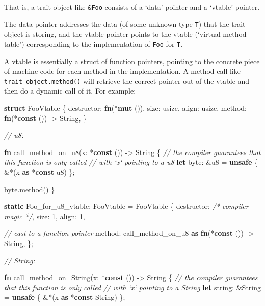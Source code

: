 \documentclass[a4paper,]{book}
\newenvironment{Shaded}{\begin{snugshade}}{\end{snugshade}}
\newcommand{\KeywordTok}[1]{\textcolor[rgb]{0.13,0.29,0.53}{\textbf{{#1}}}}
\newcommand{\DataTypeTok}[1]{\textcolor[rgb]{0.13,0.29,0.53}{{#1}}}
\newcommand{\DecValTok}[1]{\textcolor[rgb]{0.00,0.00,0.81}{{#1}}}
\newcommand{\CommentTok}[1]{\textcolor[rgb]{0.56,0.35,0.01}{\textit{{#1}}}}
\newcommand{\NormalTok}[1]{{#1}}
\begin{document}
That is, a trait object like \texttt{\&Foo} consists of a `data' pointer
and a `vtable' pointer.

The data pointer addresses the data (of some unknown type \texttt{T})
that the trait object is storing, and the vtable pointer points to the
vtable (`virtual method table') corresponding to the implementation of
\texttt{Foo} for \texttt{T}.

A vtable is essentially a struct of function pointers, pointing to the
concrete piece of machine code for each method in the implementation. A
method call like \texttt{trait\_object.method()} will retrieve the
correct pointer out of the vtable and then do a dynamic call of it. For
example:

\begin{Shaded}
\begin{Highlighting}[]
\KeywordTok{struct} \NormalTok{FooVtable \{}
    \NormalTok{destructor: }\KeywordTok{fn}\NormalTok{(*}\KeywordTok{mut} \NormalTok{()),}
    \NormalTok{size: }\DataTypeTok{usize}\NormalTok{,}
    \NormalTok{align: }\DataTypeTok{usize}\NormalTok{,}
    \NormalTok{method: }\KeywordTok{fn}\NormalTok{(*}\KeywordTok{const} \NormalTok{()) -> }\DataTypeTok{String}\NormalTok{,}
\NormalTok{\}}

\CommentTok{// u8:}

\KeywordTok{fn} \NormalTok{call_method_on_u8(x: *}\KeywordTok{const} \NormalTok{()) -> }\DataTypeTok{String} \NormalTok{\{}
    \CommentTok{// the compiler guarantees that this function is only called}
    \CommentTok{// with `x` pointing to a u8}
    \KeywordTok{let} \NormalTok{byte: &}\DataTypeTok{u8} \NormalTok{= }\KeywordTok{unsafe} \NormalTok{\{ &*(x }\KeywordTok{as} \NormalTok{*}\KeywordTok{const} \DataTypeTok{u8}\NormalTok{) \};}

    \NormalTok{byte.method()}
\NormalTok{\}}

\KeywordTok{static} \NormalTok{Foo_for_u8_vtable: FooVtable = FooVtable \{}
    \NormalTok{destructor: }\CommentTok{/* compiler magic */}\NormalTok{,}
    \NormalTok{size: }\DecValTok{1}\NormalTok{,}
    \NormalTok{align: }\DecValTok{1}\NormalTok{,}

    \CommentTok{// cast to a function pointer}
    \NormalTok{method: call_method_on_u8 }\KeywordTok{as} \KeywordTok{fn}\NormalTok{(*}\KeywordTok{const} \NormalTok{()) -> }\DataTypeTok{String}\NormalTok{,}
\NormalTok{\};}


\CommentTok{// String:}

\KeywordTok{fn} \NormalTok{call_method_on_String(x: *}\KeywordTok{const} \NormalTok{()) -> }\DataTypeTok{String} \NormalTok{\{}
    \CommentTok{// the compiler guarantees that this function is only called}
    \CommentTok{// with `x` pointing to a String}
    \KeywordTok{let} \NormalTok{string: &}\DataTypeTok{String} \NormalTok{= }\KeywordTok{unsafe} \NormalTok{\{ &*(x }\KeywordTok{as} \NormalTok{*}\KeywordTok{const} \DataTypeTok{String}\NormalTok{) \};}


\end{Highlighting}
\end{Shaded}
\end{document}
